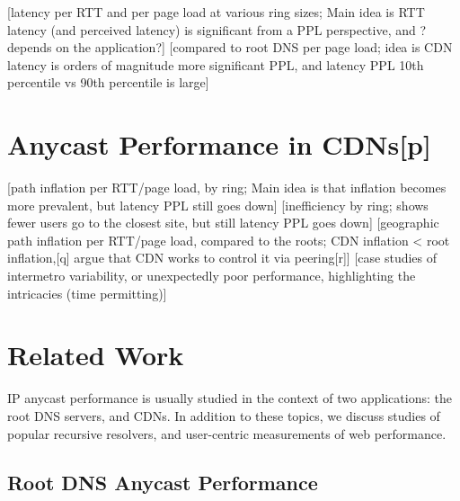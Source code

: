 \documentclass[sigconf,letterpaper,nonacm,10pt]{acmart}
\begin{document}
\label{sec:does_anycast_matter_cdn} {[}latency per RTT and per page load
at various ring sizes; Main idea is RTT latency (and perceived latency)
is significant from a PPL perspective, and ?depends on the
application?{]} {[}compared to root DNS per page load; idea is CDN
latency is orders of magnitude more significant PPL, and latency PPL
10th percentile vs 90th percentile is large{]}

\hypertarget{anycast-performance-in-cdnsp}{%
\section{Anycast Performance in
CDNs{[}p{]}}\label{anycast-performance-in-cdnsp}}

\label{sec:cdn_anycast} {[}path inflation per RTT/page load, by ring;
Main idea is that inflation becomes more prevalent, but latency PPL
still goes down{]} {[}inefficiency by ring; shows fewer users go to the
closest site, but still latency PPL goes down{]} {[}geographic path
inflation per RTT/page load, compared to the roots; CDN inflation
\textless{} root inflation,{[}q{]} argue that CDN works to control it
via peering{[}r{]}{]} {[}case studies of intermetro variability, or
unexpectedly poor performance, highlighting the intricacies (time
permitting){]}

\hypertarget{related-work-1}{%
\section{Related Work}\label{related-work-1}}

\label{sec:related} IP anycast performance is usually studied in the
context of two applications: the root DNS servers, and CDNs. In addition
to these topics, we discuss studies of popular recursive resolvers, and
user-centric measurements of web performance.

\hypertarget{root-dns-anycast-performance}{%
\subsection{Root DNS Anycast
Performance}\label{root-dns-anycast-performance}}
\end{document}
